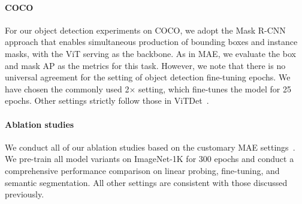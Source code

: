 \paragraph{COCO~\cite{coco}} For our object detection experiments on COCO, we adopt the Mask R-CNN approach\cite{maskrcnn} that enables simultaneous production of bounding boxes and instance masks, with the ViT serving as the backbone. As in MAE, we evaluate the box and mask AP as the metrics for this task. However, we note that there is no universal agreement for the setting of object detection fine-tuning epochs. We have chosen the commonly used 2$\times$ setting, which fine-tunes the model for 25 epochs. Other settings strictly follow those in ViTDet~\cite{ViTDet}.

\paragraph{Ablation studies} We conduct all of our ablation studies based on the customary MAE settings~\cite{MixMIM, CAE}. We pre-train all model variants on ImageNet-1K for 300 epochs and conduct a comprehensive performance comparison on linear probing, fine-tuning, and semantic segmentation. All other settings are consistent with those discussed previously.


